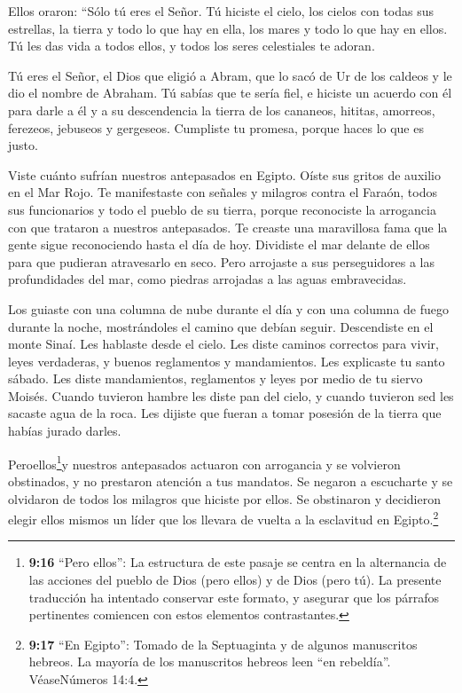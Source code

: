  Ellos oraron: ``Sólo tú eres el Señor. Tú hiciste el cielo,
los cielos con todas sus estrellas, la tierra y todo lo que hay en ella,
los mares y todo lo que hay en ellos. Tú les das vida a todos ellos, y
todos los seres celestiales te adoran.

 Tú eres el Señor, el Dios que eligió a Abram, que lo sacó
de Ur de los caldeos y le dio el nombre de Abraham.  Tú
sabías que te sería fiel, e hiciste un acuerdo con él para darle a él y
a su descendencia la tierra de los cananeos, hititas, amorreos,
ferezeos, jebuseos y gergeseos. Cumpliste tu promesa, porque haces lo
que es justo.

 Viste cuánto sufrían nuestros antepasados en Egipto. Oíste
sus gritos de auxilio en el Mar Rojo.  Te manifestaste con
señales y milagros contra el Faraón, todos sus funcionarios y todo el
pueblo de su tierra, porque reconociste la arrogancia con que trataron a
nuestros antepasados. Te creaste una maravillosa fama que la gente sigue
reconociendo hasta el día de hoy.  Dividiste el mar delante
de ellos para que pudieran atravesarlo en seco. Pero arrojaste a sus
perseguidores a las profundidades del mar, como piedras arrojadas a las
aguas embravecidas.

 Los guiaste con una columna de nube durante el día y con
una columna de fuego durante la noche, mostrándoles el camino que debían
seguir.  Descendiste en el monte Sinaí. Les hablaste desde
el cielo. Les diste caminos correctos para vivir, leyes verdaderas, y
buenos reglamentos y mandamientos.  Les explicaste tu santo
sábado. Les diste mandamientos, reglamentos y leyes por medio de tu
siervo Moisés.  Cuando tuvieron hambre les diste pan del
cielo, y cuando tuvieron sed les sacaste agua de la roca. Les dijiste
que fueran a tomar posesión de la tierra que habías jurado darles.

 Peroellos\footnote{\textbf{9:16} ``Pero ellos'': La
  estructura de este pasaje se centra en la alternancia de las acciones
  del pueblo de Dios (pero ellos) y de Dios (pero tú). La presente
  traducción ha intentado conservar este formato, y asegurar que los
  párrafos pertinentes comiencen con estos elementos contrastantes.}y
nuestros antepasados actuaron con arrogancia y se volvieron obstinados,
y no prestaron atención a tus mandatos.  Se negaron a
escucharte y se olvidaron de todos los milagros que hiciste por ellos.
Se obstinaron y decidieron elegir ellos mismos un líder que los llevara
de vuelta a la esclavitud en Egipto.\footnote{\textbf{9:17} ``En
  Egipto'': Tomado de la Septuaginta y de algunos manuscritos hebreos.
  La mayoría de los manuscritos hebreos leen ``en rebeldía''.
  VéaseNúmeros 14:4.}

